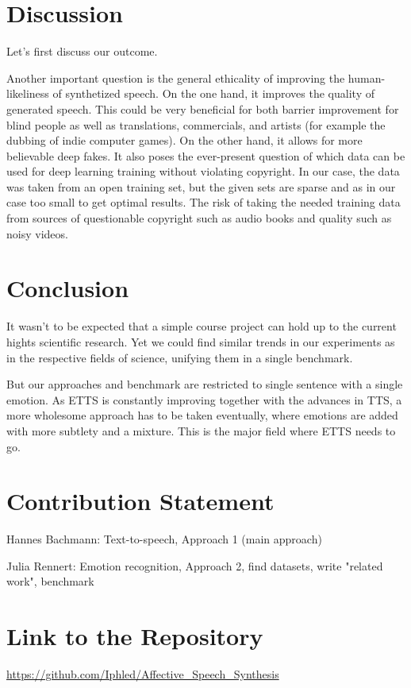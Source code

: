 \documentclass[11pt]{article}
\begin{document}
\section{Discussion}
\label{discussion}
Let's first discuss our outcome.

Another important question is the general ethicality of improving the human-likeliness of synthetized speech. On the one hand, it improves the quality of generated speech. This could be very beneficial for both barrier improvement for blind people as well as translations, commercials, and artists (for example the dubbing of indie computer games). On the other hand, it allows for more believable deep fakes. It also poses the ever-present question of which data can be used for deep learning training without violating copyright. In our case, the data was taken from an open training set, but the given sets are sparse and as in our case too small to get optimal results\cite{he_improve_2022}. The risk of taking the needed training data from sources of questionable copyright such as audio books and quality such as noisy videos.

\section{Conclusion}
\label{conclusion}
It wasn't to be expected that a simple course project can hold up to the current hights scientific research. Yet we could find similar trends in our experiments as in the respective fields of science, unifying them in a single benchmark. 

But our approaches and benchmark are restricted to single sentence with a single emotion.
As ETTS is constantly improving together with the advances in TTS, a more wholesome approach has to be taken eventually, where emotions are added with more subtlety and a mixture. This is the major field where ETTS needs to go.

\section{Contribution Statement}
Hannes Bachmann: Text-to-speech, Approach 1 (main approach)

Julia Rennert: Emotion recognition, Approach 2, find datasets, write "related work", benchmark

\section{Link to the Repository}
{\small\url{https://github.com/Iphled/Affective\_Speech\_Synthesis}}
\end{document}
